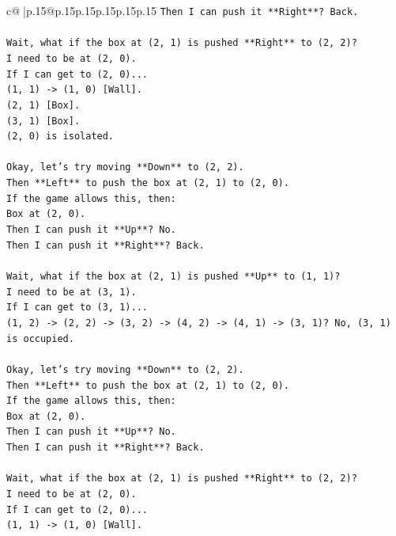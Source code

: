 \documentclass{article}
\begin{document}
{\begin{supertabular}{c@{$\;$}|p{.15\linewidth}@{}p{.15\linewidth}p{.15\linewidth}p{.15\linewidth}p{.15\linewidth}p{.15\linewidth}}
{{{\texttt{Then I can push it **Right**? Back.} \\
\\ 
\texttt{Wait, what if the box at (2, 1) is pushed **Right** to (2, 2)?} \\
\texttt{I need to be at (2, 0).} \\
\texttt{If I can get to (2, 0)...} \\
\texttt{(1, 1) {-}> (1, 0) {[}Wall{]}.} \\
\texttt{(2, 1) {[}Box{]}.} \\
\texttt{(3, 1) {[}Box{]}.} \\
\texttt{(2, 0) is isolated.} \\
\\ 
\texttt{Okay, let's try moving **Down** to (2, 2).} \\
\texttt{Then **Left** to push the box at (2, 1) to (2, 0).} \\
\texttt{If the game allows this, then:} \\
\texttt{Box at (2, 0).} \\
\texttt{Then I can push it **Up**? No.} \\
\texttt{Then I can push it **Right**? Back.} \\
\\ 
\texttt{Wait, what if the box at (2, 1) is pushed **Up** to (1, 1)?} \\
\texttt{I need to be at (3, 1).} \\
\texttt{If I can get to (3, 1)...} \\
\texttt{(1, 2) {-}> (2, 2) {-}> (3, 2) {-}> (4, 2) {-}> (4, 1) {-}> (3, 1)? No, (3, 1) is occupied.} \\
\\ 
\texttt{Okay, let's try moving **Down** to (2, 2).} \\
\texttt{Then **Left** to push the box at (2, 1) to (2, 0).} \\
\texttt{If the game allows this, then:} \\
\texttt{Box at (2, 0).} \\
\texttt{Then I can push it **Up**? No.} \\
\texttt{Then I can push it **Right**? Back.} \\
\\ 
\texttt{Wait, what if the box at (2, 1) is pushed **Right** to (2, 2)?} \\
\texttt{I need to be at (2, 0).} \\
\texttt{If I can get to (2, 0)...} \\
\texttt{(1, 1) {-}> (1, 0) {[}Wall{]}.} \\
}}}
\end{supertabular}}
\end{document}
